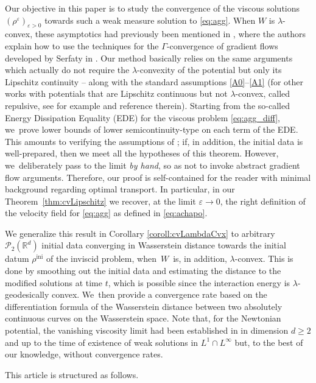 \documentclass[11pt]{article}
\numberwithin{equation}{section}
\newcommand{\ini}{\mathrm{ini}}
\def\RR{\mathbb{R}}
\def\eps{\varepsilon}
\def\calP{{\mathcal P}}
\theoremstyle{plain}
\theoremstyle{definition}
\begin{document}
Our objective in this paper is to study the convergence of the viscous solutions $(\rho^\eps)_{\eps>0}$ towards such a weak measure solution to \eqref{eq:agg}. When $W$ is $\lambda$-convex, these asymptotics had previously been mentioned in \cite{carrilloReview18}, where the authors explain how to use the techniques for the $\Gamma$-convergence of gradient flows developed by Serfaty in \cite{serfaty10}. Our method basically relies on the same arguments which actually do not require the $\lambda$-convexity of the potential but only its Lipschitz continuity -- along with the standard assumptions \eqref{A0}--\eqref{A1} (for other works with potentials that are Lipschitz continuous but not $\lambda$-convex, called repulsive, see for example \cite{raoul} and reference therein). Starting from the so-called Energy Dissipation Equality (EDE) for the viscous problem \eqref{eq:agg_diff}, we~prove lower bounds of lower semicontinuity-type on each term of the EDE. This amounts to verifying the assumptions of \cite[Th.\,2]{serfaty10}; if, in addition, the initial data is well-prepared, then we meet all the hypotheses of this theorem. However, we~deliberately pass to the limit \textit{by hand}, so as not to invoke abstract gradient flow arguments. Therefore, our proof is self-contained for the reader with minimal background regarding optimal transport. In particular, in our Theorem~\ref{thm:cvLipschitz} we recover, at the limit $\eps \to 0$, the right definition of the velocity field for \eqref{eq:agg} as defined in \eqref{eq:achapo}.

We generalize this result in Corollary \ref{coroll:cvLambdaCvx} to arbitrary $\calP_2(\RR^d)$ initial data converging in Wasserstein distance towards the initial datum $\rho^{\ini}$ of the inviscid problem, when~$W$~is, in addition, $\lambda$-convex. This is done by smoothing out the initial data and estimating the distance to the modified solutions at time $t$, which is possible since the interaction energy is $\lambda$-geodesically convex. We~then provide a convergence rate based on the differentiation formula of the Wasserstein distance between two absolutely continuous curves on the Wasserstein space. Note that, for the Newtonian potential, the vanishing viscosity limit had been established in \cite{cozzi16} in dimension $d \geq 2$ and up to the time of existence of weak solutions in $L^1 \cap L^\infty$ but, to the best of our knowledge, without convergence rates.

This article is structured as follows.\enlargethispage{.5\baselineskip}%
\end{document}
